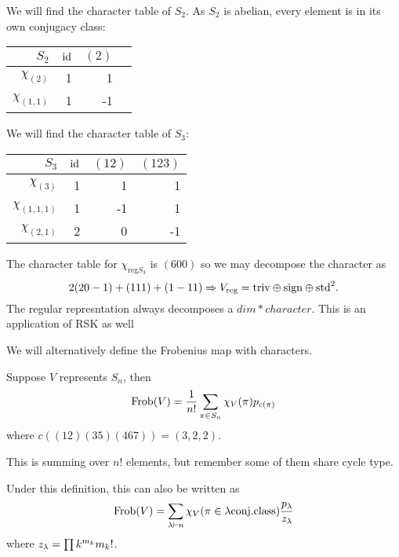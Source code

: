 \documentclass[12pt]{memoir}
\begin{document}
\begin{Ex}
    We will find the character table of $S_2$. As $S_2$ is abelian, every element is in its own conjugacy class:
    \begin{table*}[h]
        \centering
        \begin{tabular}{rrrr}\toprule
            $S_2$ &$\operatorname{id}$& $(2)$\\ \midrule
            $\chi_{(2)}$&1 & 1\\
            $\chi_{(1,1)}$&1 & -1\\
       \bottomrule
        \end{tabular}
        \end{table*}
\end{Ex}


\begin{Ex}
    We will find the character table of $S_3$:
    \begin{table*}[h]
        \centering
        \begin{tabular}{rrrr}\toprule
            $S_3$ &$\operatorname{id}$& $(12)$&$(123)$\\ \midrule
            $\chi_{(3)}$&1 & 1&1\\
            $\chi_{(1,1,1)}$&1 & -1&1\\
            $\chi_{(2,1)}$&2 & 0&-1\\
       \bottomrule
        \end{tabular}
        \end{table*}
\end{Ex}

The character table for $\chi_{\text{reg}S_3}$ is $(600)$ so we may decompose the character as 
$$2(20-1)+(111)+(1-11)\Rightarrow V_{\text{reg}}=\text{triv}\oplus\text{sign}\oplus\text{std}^2.$$
The regular represntation always decomposes a $dim*character$. This is an application of RSK as well 

We will alternatively define the Frobenius map with characters.
\begin{Def}
    Suppose $V$ represents $S_n$, then 
    $$\operatorname{Frob}(V)=\frac{1}{n!}\sum_{\pi\in S_n}\chi_V(\pi)p_{c(\pi)}$$
    where $c((12)(35)(467))=(3,2,2)$.
\end{Def}

This is summing over $n!$ elements, but remember some of them share cycle type. 

\begin{Lem}
    Under this definition, this can also be written as 
    $$\operatorname{Frob}(V)=\sum_{\lambda\vdash n}\chi_V(\pi\in\lambda\text{conj.class})\frac{p_\lambda}{z_\lambda}$$
    where $z_\lambda=\prod k^{m_k}m_k!$.
\end{Lem}
\end{document}
